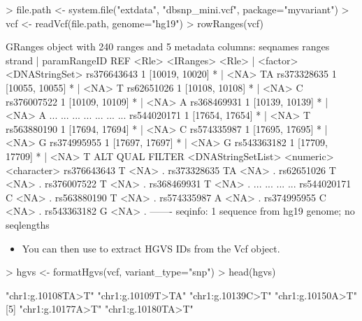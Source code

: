 \documentclass[12pt]{article}
\begin{document}
\begin{Schunk}
\begin{Sinput}
> file.path <- system.file("extdata", "dbsnp_mini.vcf", package="myvariant")
> vcf <- readVcf(file.path, genome="hg19")
> rowRanges(vcf)
\end{Sinput}
\begin{Soutput}
GRanges object with 240 ranges and 5 metadata columns:
              seqnames         ranges strand   | paramRangeID            REF
                 <Rle>      <IRanges>  <Rle>   |     <factor> <DNAStringSet>
  rs376643643        1 [10019, 10020]      *   |         <NA>             TA
  rs373328635        1 [10055, 10055]      *   |         <NA>              T
   rs62651026        1 [10108, 10108]      *   |         <NA>              C
  rs376007522        1 [10109, 10109]      *   |         <NA>              A
  rs368469931        1 [10139, 10139]      *   |         <NA>              A
          ...      ...            ...    ... ...          ...            ...
  rs544020171        1 [17654, 17654]      *   |         <NA>              T
  rs563880190        1 [17694, 17694]      *   |         <NA>              C
  rs574335987        1 [17695, 17695]      *   |         <NA>              G
  rs374995955        1 [17697, 17697]      *   |         <NA>              G
  rs543363182        1 [17709, 17709]      *   |         <NA>              T
                             ALT      QUAL      FILTER
              <DNAStringSetList> <numeric> <character>
  rs376643643                  T      <NA>           .
  rs373328635                 TA      <NA>           .
   rs62651026                  T      <NA>           .
  rs376007522                  T      <NA>           .
  rs368469931                  T      <NA>           .
          ...                ...       ...         ...
  rs544020171                  C      <NA>           .
  rs563880190                  T      <NA>           .
  rs574335987                  A      <NA>           .
  rs374995955                  C      <NA>           .
  rs543363182                  G      <NA>           .
  -------
  seqinfo: 1 sequence from hg19 genome; no seqlengths
\end{Soutput}
\end{Schunk}
\begin{itemize}
\item You can then use  to extract HGVS IDs from the Vcf object.
\end{itemize}

\begin{Schunk}
\begin{Sinput}
> hgvs <- formatHgvs(vcf, variant_type="snp")
> head(hgvs)
\end{Sinput}
\begin{Soutput}
[1] "chr1:g.10108TA>T" "chr1:g.10109T>TA" "chr1:g.10139C>T"  "chr1:g.10150A>T" 
[5] "chr1:g.10177A>T"  "chr1:g.10180TA>T"
\end{Soutput}
\end{Schunk}
\end{document}
